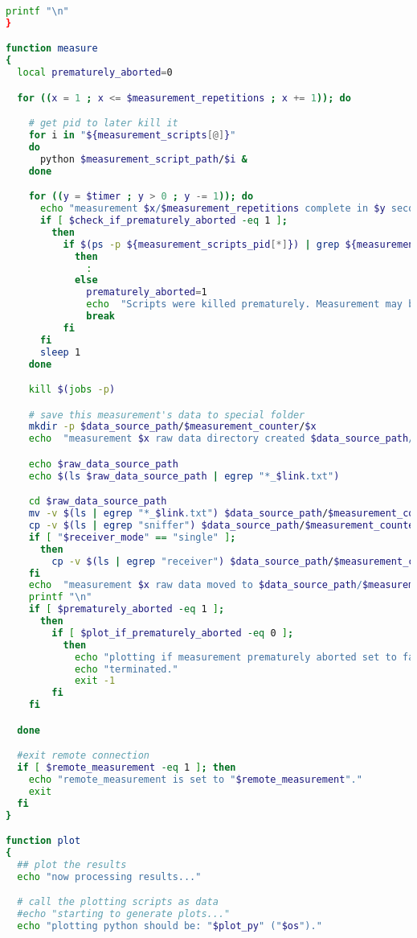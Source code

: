\begin{lstlisting}[language=Bash,caption=measure.sh]
    printf "\n"
}

function measure
{
  local prematurely_aborted=0

  for ((x = 1 ; x <= $measurement_repetitions ; x += 1)); do

    # get pid to later kill it
    for i in "${measurement_scripts[@]}"
    do
      python $measurement_script_path/$i &
    done

    for ((y = $timer ; y > 0 ; y -= 1)); do
      echo "measurement $x/$measurement_repetitions complete in $y second(s)."
      if [ $check_if_prematurely_aborted -eq 1 ];
        then
          if $(ps -p ${measurement_scripts_pid[*]}) | grep ${measurement_scripts_pid[*]};
            then
              :
            else
              prematurely_aborted=1
              echo  "Scripts were killed prematurely. Measurement may be incomplete."
              break
          fi
      fi
      sleep 1
    done

    kill $(jobs -p)

    # save this measurement's data to special folder
    mkdir -p $data_source_path/$measurement_counter/$x
    echo  "measurement $x raw data directory created $data_source_path/$measurement_counter/$x/."

    echo $raw_data_source_path
    echo $(ls $raw_data_source_path | egrep "*_$link.txt")

    cd $raw_data_source_path
    mv -v $(ls | egrep "*_$link.txt") $data_source_path/$measurement_counter/$x/
    cp -v $(ls | egrep "sniffer") $data_source_path/$measurement_counter/$x/
    if [ "$receiver_mode" == "single" ];
      then
        cp -v $(ls | egrep "receiver") $data_source_path/$measurement_counter/$x/
    fi
    echo  "measurement $x raw data moved to $data_source_path/$measurement_counter/$x/."
    printf "\n"
    if [ $prematurely_aborted -eq 1 ];
      then
        if [ $plot_if_prematurely_aborted -eq 0 ];
          then
            echo "plotting if measurement prematurely aborted set to false."
            echo "terminated."
            exit -1
        fi
    fi

  done

  #exit remote connection
  if [ $remote_measurement -eq 1 ]; then
    echo "remote_measurement is set to "$remote_measurement"."
    exit
  fi
}

function plot
{
  ## plot the results
  echo "now processing results..."

  # call the plotting scripts as data
  #echo "starting to generate plots..."
  echo "plotting python should be: "$plot_py" ("$os")."


\end{lstlisting}
